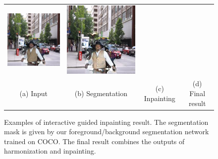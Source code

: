 \begin{figure}[h!]
\begin{tabular}{cccc}
  \includegraphics[width=.24\textwidth]{figures/guided/000000488251_inpainting.jpg}&
  \includegraphics[width=.24\textwidth]{figures/guided/000000488251_inpainting_harmonization.jpg} \\
  (a) Input & (b) Segmentation  & (c) Inpainting & (d) Final result  \\
\end{tabular}
\caption{Examples of interactive guided inpainting result. The segmentation mask is given by our foreground/background segmentation network trained on COCO. The final result combines the outputs of harmonization and inpainting.}
\label{fig:guided}
\vspace{-15pt}
\end{figure}

